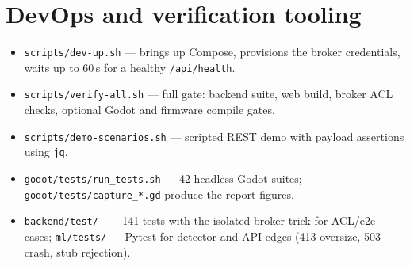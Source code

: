 \section{DevOps and verification tooling}

\begin{itemize}
  \item \texttt{scripts/dev-up.sh} --- brings up Compose, provisions the
        broker credentials, waits up to 60\,s for a healthy
        \texttt{/api/health}.
  \item \texttt{scripts/verify-all.sh} --- full gate: backend suite, web
        build, broker ACL checks, optional Godot and firmware compile
        gates.
  \item \texttt{scripts/demo-scenarios.sh} --- scripted REST demo with
        payload assertions using \texttt{jq}.
  \item \texttt{godot/tests/run\_tests.sh} --- 42 headless Godot suites;
        \texttt{godot/tests/capture\_*.gd} produce the report figures.
  \item \texttt{backend/test/} --- ~141 tests with the isolated-broker trick
        for ACL/e2e cases; \texttt{ml/tests/} --- Pytest for detector and
        API edges (413 oversize, 503 crash, stub rejection).
\end{itemize}
